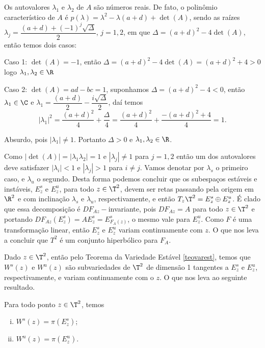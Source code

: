 Os autovalores $\lambda_1$ e $\lambda_2$ de $A$ são números reais. De fato, o polinômio característico de $A$ é $p(\lambda)=\lambda^2-\lambda(a+d)+\det(A)$, sendo as raízes $\lambda_j=\dfrac{(a+d)+(-1)^j\sqrt{\Delta}}{2}$, $j=1,2$, em que $\Delta=(a+d)^2-4\det(A)$, então temos dois casos:

Caso 1: $\det(A)=-1$, então $\Delta=(a+d)^2-4\det(A)=(a+d)^2+4>0$ logo $\lambda_1,\lambda_2\in\R$

Caso 2: $\det(A)=ad-bc=1$, suponhamos $\Delta=(a+d)^2-4<0$, então $\lambda_1\in\C$ e $\lambda_1=\dfrac{(a+d)}{2}-\dfrac{i\sqrt{\Delta}}{2}$, daí temos $$|\lambda_1|^2=\dfrac{(a+d)^2}{4}+\dfrac{\Delta}{4}=\dfrac{(a+d)^2}{4}+\dfrac{-(a+d)^2+4}{4}=1.$$

Absurdo, pois $|\lambda_1|\neq 1$. Portanto $\Delta>0$ e $\lambda_1,\lambda_2\in\R$.

Como $|\det(A)|=|\lambda_1\lambda_2|=1$ e $|\lambda_j|\neq1$ para $j=1,2$ então um dos autovalores deve satisfazer $|\lambda_i|<1$ e $|\lambda_j|>1$ para $i\neq j$. Vamos denotar por $\lambda_s$ o primeiro caso, e $\lambda_u$ o segundo. Desta forma podemos concluir que os subespaços estáveis e instáveis, $E^s_z$ e $E^u_z$, para todo $z\in\T^2$, devem ser retas passando pela origem em $\R^2$ e com inclinação $\lambda_s$ e $\lambda_u$, respectivamente, e então $T_z\T^2=E^s_z\oplus E^u_z$. É clado que essa decomposição é $DF_{Az}-$invariante, pois $DF_{Az}=A$ para todo $z\in\T^2$ e portando $DF_{Az}(E^s_z)=AE^s_z=E^s_{F_A(z)}$, o mesmo vale para $E^u_z$. Como $F$ é uma transformação linear, então $E^s_z$ e $E^u_z$ variam continuamente com $z$. O que nos leva a concluir que $T^2$ é um conjunto hiperbólico para $F_A$.

Dado $z\in\T^2$, então pelo Teorema da Variedade Estável \ref{teovarest}, temos que $W^s(z)$ e $W^u(z)$ são subvariedades de $\T^2$ de dimensão 1 tangentes a $E^s_z$ e $E^u_z$, respectivamente, e variam continuamente com o $z$. O que nos leva ao seguinte resultado.

\begin{proposicao} Para todo ponto $z\in\T^2$, temos
\begin{enumerate}[i)]
\item $W^s(z)=\pi(E^s_z)$;
\item $W^u(z)=\pi(E^u_z)$.
\end{enumerate}
\end{proposicao}

